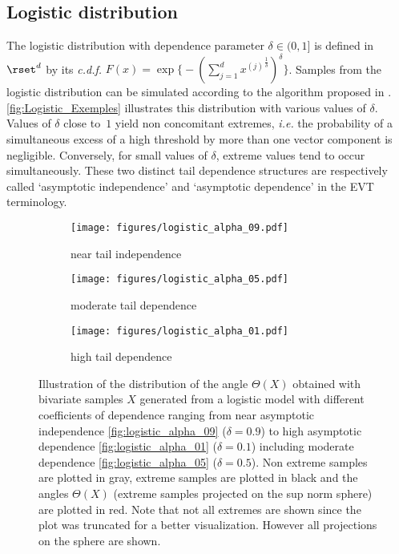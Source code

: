  
\subsection{Logistic distribution} \label{logistic_Appendix}
The logistic distribution  with dependence  parameter $\delta \in (0, 1]$  is defined in $\rset^d$ by its  \textit{c.d.f.}
$F(x) = \exp\big\{ - (\sum_{j=1}^d {x^{(j)}}^\frac{1}{\delta})^{\delta} \big\}$.
Samples from the  logistic distribution can be  simulated according to the algorithm proposed in  \citet{stephenson2003simulating}. \autoref{fig:Logistic_Exemples} illustrates this distribution with various values of $\delta$. Values of $\delta$ close to~$1$ yield  non concomitant extremes, \emph{i.e.} the probability of a simultaneous excess of a high threshold by more than one vector component is negligible. Conversely, for small values of $\delta$, extreme values tend to occur simultaneously. These two distinct tail dependence structures are respectively called  `asymptotic independence' and `asymptotic dependence' in the EVT terminology. 



\begin{figure}[tbh]
\begin{subfigure}[t]{0.32\textwidth}
    \texttt{[image: figures/logistic\_alpha\_09.pdf]}
    \caption{ near tail independence}
    \label{fig:logistic_alpha_09}
    \end{subfigure}
\begin{subfigure}[t]{0.32\textwidth}
    \texttt{[image: figures/logistic\_alpha\_05.pdf]}
    \caption{ moderate tail dependence}
    \label{fig:logistic_alpha_05}
        \end{subfigure}
\begin{subfigure}[t]{0.32\textwidth}
    \texttt{[image: figures/logistic\_alpha\_01.pdf]}
    \caption{high tail dependence}
    \label{fig:logistic_alpha_01}
\end{subfigure}
\caption{Illustration of the distribution of the angle $\Theta(X)$ obtained with bivariate samples $X$ generated from a logistic model with different coefficients of dependence ranging from near asymptotic independence  \autoref{fig:logistic_alpha_09} ($\delta = 0.9$) to high asymptotic dependence \autoref{fig:logistic_alpha_01} ($\delta = 0.1$) including moderate dependence \autoref{fig:logistic_alpha_05} ($\delta = 0.5$). Non extreme samples are plotted in gray, extreme samples are plotted in black and the angles  $\Theta(X)$ (extreme samples projected on the sup norm sphere) are plotted in red. Note that not all extremes are shown since the plot was truncated for a better visualization. However all projections on the sphere are shown.}
\label{fig:Logistic_Exemples}
\end{figure}



